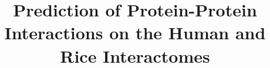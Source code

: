 \documentclass{bmcart}
\begin{document}
\begin{frontmatter}

\begin{fmbox}


\title{Prediction of Protein-Protein Interactions on the Human and Rice Interactomes}


\author[
  addressref={aff1},                   %
  corref={aff1},                       %
  email={nicolaslopez@javerianacali.edu.co}   %
]{ }
\author[
  addressref={aff1},
  email={jfinke@javerianacali.edu.co}
]{ }
\author[
  addressref={aff1},
  email={camilo.rocha@javerianacali.edu.co}
]{ }


\address[id=aff1]{%
  ,             %
  ,          %
  ,                              %
}



\end{fmbox}
\end{frontmatter}
\end{document}
